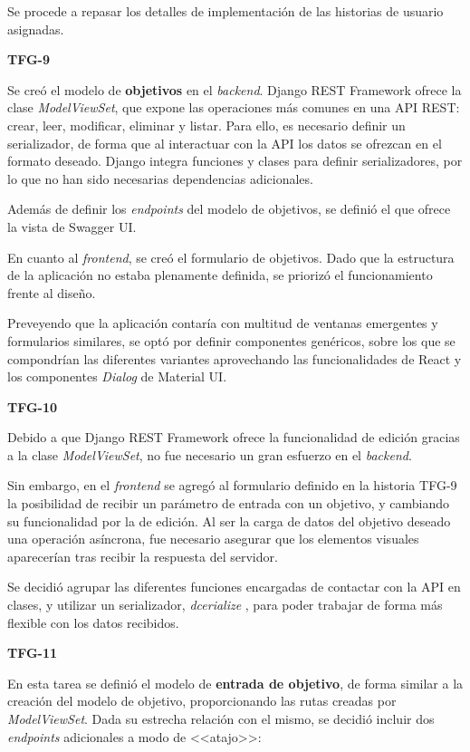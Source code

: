 \documentclass[10pt, a4paper]{aqademic}
\begin{document}
Se procede a repasar los detalles de implementación de las historias de usuario asignadas.

\textbf{TFG-9}

Se creó el modelo de \textbf{objetivos} en el \textit{backend}. Django REST Framework ofrece la clase \textit{ModelViewSet}, que expone las operaciones más comunes en una API REST: crear, leer, modificar, eliminar y listar. Para ello, es necesario definir un serializador, de forma que al interactuar con la API los datos se ofrezcan en el formato deseado. Django integra funciones y clases para definir serializadores, por lo que no han sido necesarias dependencias adicionales.

Además de definir los \textit{endpoints} del modelo de objetivos, se definió el que ofrece la vista de Swagger UI.


En cuanto al \textit{frontend}, se creó el formulario de objetivos. Dado que la estructura de la aplicación no estaba plenamente definida, se priorizó el funcionamiento frente al diseño. 

Preveyendo que la aplicación contaría con multitud de ventanas emergentes y formularios similares, se optó por definir componentes genéricos, sobre los que se compondrían las diferentes variantes aprovechando las funcionalidades de React y los componentes \textit{Dialog} de Material UI.

\medskip

\textbf{TFG-10}

Debido a que Django REST Framework ofrece la funcionalidad de edición gracias a la clase \textit{ModelViewSet}, no fue necesario un gran esfuerzo en el \textit{backend}.

Sin embargo, en el \textit{frontend} se agregó al formulario definido en la historia TFG-9 la posibilidad de recibir un parámetro de entrada con un objetivo, y cambiando su funcionalidad por la de edición. Al ser la carga de datos del objetivo deseado una operación asíncrona, fue necesario asegurar que los elementos visuales aparecerían tras recibir la respuesta del servidor.

Se decidió agrupar las diferentes funciones encargadas de contactar con la API en clases, y utilizar un serializador, \textit{dcerialize} \cite{noauthor_dcerialize_nodate}, para poder trabajar de forma más flexible con los datos recibidos. 

\medskip

\textbf{TFG-11}

En esta tarea se definió el modelo de \textbf{entrada de objetivo}, de forma similar a la creación del modelo de objetivo, proporcionando las rutas creadas por \textit{ModelViewSet}. Dada su estrecha relación con el mismo, se decidió incluir dos \textit{endpoints} adicionales a modo de <<atajo>>: 
\end{document}
